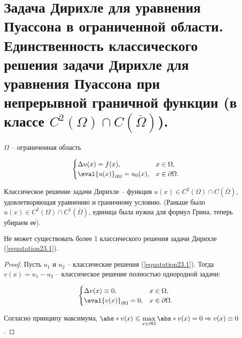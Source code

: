 
\section{Задача Дирихле для уравнения Пуассона в ограниченной области. Единственность классического решения задачи Дирихле для уравнения Пуассона при непрерывной граничной функции (в классе $C^2(\Omega) \cap C(\overline{\Omega})$).}

$\Omega$ -- ограниченная область 

\begin{equation}
  \begin{cases}\label{equatation23.1}
  \Delta u(x) = f(x), & x \in \Omega,\\ 
  \eval{u(x)}_{\partial \Omega} = u_0(x), & x \in \partial \Omega.\\
  \end{cases}
\end{equation} 
  
 \begin{definition}
 Классическое решение задачи Дирихле -- функция
  $u(x) \in C^2(\Omega) \cap C(\overline{\Omega})$,
  удовлетворяющая уравнению и граничному условию. (Раньше было $u(x) \in C^2(\Omega) \cap C^{\boxed{1}}(\overline{\Omega})$, единица была нужна для формул Грина, теперь убираем ее).
 \end{definition}
 \begin{theorem}[Единственности] Не может существовать более 1 классического решения задачи Дирихле (\ref{equatation23.1}).
 
 \begin{proof}
 Пусть $u_1$ и $u_2$ -- классические решения (\ref{equatation23.1}). Тогда $v(x) = u_1 - u_2$ -- классическое решение полностью однородной задачи:
 
 \begin{equation}
  \begin{cases}\label{equatation23.2}
  \Delta v(x) \equiv 0, & x \in \Omega,\\ 
  \eval{v(x)}_{\partial \Omega} = 0, & x \in \partial \Omega.\\
  \end{cases}
\end{equation}
 
 Согласно принципу максимума, $\abs*{v(x)} \leq \max\limits_{x \in \partial\Omega} \abs*{v(x)} = 0 \Rightarrow v(x) \equiv 0$.
 \end{proof}
 \end{theorem}
